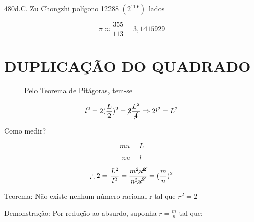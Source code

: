 \documentclass[a4paper, 12pt]{article}
\begin{document}
{480d.C. Zu Chongzhi polígono 12288 $(2^11.6)$ lados}

\[\pi \approx \frac{355}{113} = 3,1415929\]

\newpage

\section{DUPLICAÇÃO DO QUADRADO}

\begin{figure} [h!]
    \begin{minipage}[!] {0.4\linewidth}
        \caption{}
    \end{minipage}
    \begin{minipage}[!] {0.4\linewidth}
        {Pelo Teorema de Pitágoras, tem-se}

        \[l^2 = 2 (\frac{L}{2})^2 = \cancel{2} \frac{L^2}{\cancel{4}} \Rightarrow 2l^2 = L^2\] \newline

    \end{minipage}
\end{figure} 

{Como medir?}

\[mu = L\]

\[nu = l\]

\[\therefore 2 = \frac{L^2}{l^2} = \frac{m^2 \cancel{u^2}}{n^2 \cancel{u^2}} = (\frac{m}{n})^2\] \newline

{Teorema: Não existe nenhum número racional r tal que $r^2 = 2$} \newline

{Demonstração: Por redução ao absurdo, suponha $r= \frac{m}{n}$ tal que:}
\end{document}

